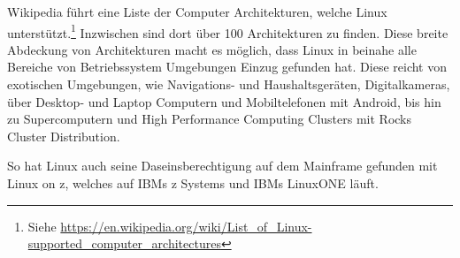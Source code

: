 Wikipedia führt eine Liste der Computer Architekturen, welche Linux unterstützt.\footnote{Siehe \url{https://en.wikipedia.org/wiki/List_of_Linux-supported_computer_architectures}}
Inzwischen sind dort über 100 Architekturen zu finden. Diese breite Abdeckung von Architekturen macht es möglich, dass Linux in beinahe alle Bereiche von Betriebssystem Umgebungen Einzug gefunden hat. Diese reicht von exotischen Umgebungen, wie Navigations- und Haushaltsgeräten, Digitalkameras, über Desktop- und Laptop Computern und Mobiltelefonen mit Android, bis hin zu Supercomputern und High Performance Computing Clusters mit Rocks Cluster Distribution.

So hat Linux auch seine Daseinsberechtigung auf dem Mainframe gefunden mit Linux on z, welches auf IBMs z Systems und IBMs LinuxONE läuft.
